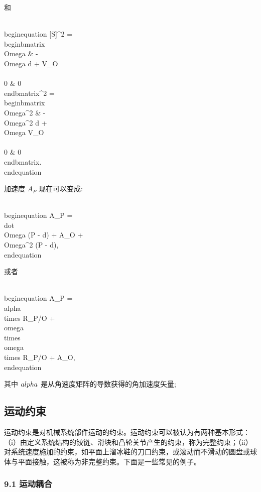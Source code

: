 和

\\begin{equation}
[S]^2 = \\begin{bmatrix}
\\Omega & -\\Omega d + V_O \\\\
0 & 0
\\end{bmatrix}^2 = \\begin{bmatrix}
\\Omega^2 & -\\Omega^2 d + \\Omega V_O \\\\
0 & 0
\\end{bmatrix}.
\\end{equation}

加速度 $A_P$ 现在可以变成:

\\begin{equation}
A_P = \\dot{\\Omega} (P - d) + A_O + \\Omega^2 (P - d),
\\end{equation}

或者

\\begin{equation}
A_P = \\alpha \\times R_{P/O} + \\omega \\times \\omega \\times R_{P/O} + A_O,
\\end{equation}

其中 $\\alpha$ 是从角速度矩阵的导数获得的角加速度矢量;



\subsection{运动约束}

运动约束是对机械系统部件运动的约束。运动约束可以被认为有两种基本形式：（i）由定义系统结构的铰链、滑块和凸轮关节产生的约束，称为完整约束；（ii）对系统速度施加的约束，如平面上溜冰鞋的刀口约束，或滚动而不滑动的圆盘或球体与平面接触，这被称为非完整约束。下面是一些常见的例子。

\subsubsection{9.1 运动耦合}

